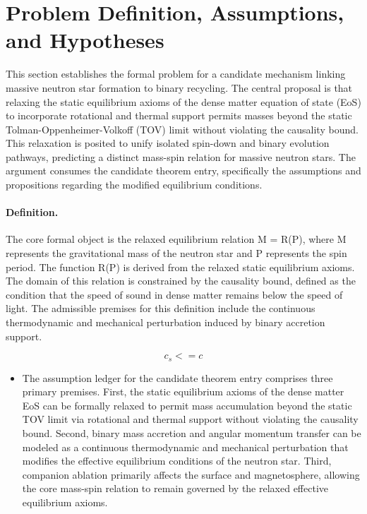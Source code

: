 \documentclass[conference]{IEEEtran}
\begin{document}
\section{Problem Definition, Assumptions, and Hypotheses}
This section establishes the formal problem for a candidate mechanism linking massive neutron star formation to binary recycling. The central proposal is that relaxing the static equilibrium axioms of the dense matter equation of state (EoS) to incorporate rotational and thermal support permits masses beyond the static Tolman-Oppenheimer-Volkoff (TOV) limit without violating the causality bound. This relaxation is posited to unify isolated spin-down and binary evolution pathways, predicting a distinct mass-spin relation for massive neutron stars. The argument consumes the candidate theorem entry, specifically the assumptions and propositions regarding the modified equilibrium conditions.

\paragraph{Definition.} The core formal object is the relaxed equilibrium relation M = R(P), where M represents the gravitational mass of the neutron star and P represents the spin period. The function R(P) is derived from the relaxed static equilibrium axioms. The domain of this relation is constrained by the causality bound, defined as the condition that the speed of sound in dense matter remains below the speed of light. The admissible premises for this definition include the continuous thermodynamic and mechanical perturbation induced by binary accretion support.

\begin{equation}
c_s <= c
\label{eq:formal-problem-and-hypotheses-b3}
\end{equation}

\begin{itemize}
\item The assumption ledger for the candidate theorem entry comprises three primary premises. First, the static equilibrium axioms of the dense matter EoS can be formally relaxed to permit mass accumulation beyond the static TOV limit via rotational and thermal support without violating the causality bound. Second, binary mass accretion and angular momentum transfer can be modeled as a continuous thermodynamic and mechanical perturbation that modifies the effective equilibrium conditions of the neutron star. Third, companion ablation primarily affects the surface and magnetosphere, allowing the core mass-spin relation to remain governed by the relaxed effective equilibrium axioms.
\end{itemize}
\end{document}
